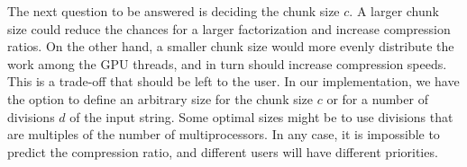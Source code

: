 %
%

The next question to be answered is deciding the chunk size $c$. 
A larger chunk size could reduce the chances for a larger factorization and increase compression ratios.
On the other hand, a smaller chunk size would more evenly distribute the work among the GPU threads, and in turn should increase compression speeds.
This is a trade-off that should be left to the user.
In our implementation, we have the option to define an arbitrary size for the chunk size $c$ or for a number of divisions $d$ of the input string.
Some optimal sizes might be to use divisions that are multiples of the number of multiprocessors.
In any case, it is impossible to predict the compression ratio, and different users will have different priorities.


